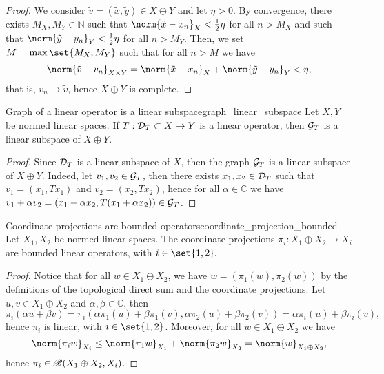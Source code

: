 \begin{proof}
    We consider \(\tilde{v} = (\tilde{x}, \tilde{y}) \in X \oplus Y\) and let \(\eta > 0\). By convergence, there exists \(M_X, M_Y \in \mathbb{N}\) such that \(\norm{\tilde{x} - x_n}_X < \frac12 \eta\) for all \(n > M_X\) and such that \(\norm{\tilde{y} - y_n}_Y < \frac12 \eta\) for all \(n > M_Y\). Then, we set \(M = \max\set{M_X, M_Y}\) such that for all \(n > M\) we have
    \begin{equation*}
        \norm{\tilde{v} - v_n}_{X\times Y} = \norm{\tilde{x} - x_n}_X + \norm{\tilde{y} - y_n}_Y < \eta,
    \end{equation*}
    that is, \(v_n \to \tilde{v}\), hence \(X \oplus Y\) is complete.
\end{proof}

\begin{proposition}{Graph of a linear operator is a linear subspace}{graph_linear_subspace}
    Let \(X, Y\) be normed linear spaces. If \(T : \mathcal{D}_{T} \subset X \to Y\) is a linear operator, then \(\mathcal{G}_{T}\) is a linear subspace of \(X \oplus Y\).
\end{proposition}
\begin{proof}
    Since \(\mathcal{D}_{T}\) is a linear subspace of \(X\), then the graph \(\mathcal{G}_{T}\) is a linear subspace of \(X \oplus Y\). Indeed, let \(v_1, v_2 \in \mathcal{G}_{T}\), then there exists \(x_1, x_2 \in \mathcal{D}_{T}\) such that \(v_1 = (x_1, Tx_1)\) and \(v_2 = (x_2, Tx_2)\), hence for all \(\alpha \in \mathbb{C}\) we have \(v_1 + \alpha v_2 = (x_1 + \alpha x_2, T(x_1 + \alpha x_2)) \in \mathcal{G}_{T}\).
\end{proof}
\begin{proposition}{Coordinate projections are bounded operators}{coordinate_projection_bounded}
    Let \(X_1, X_2\) be normed linear spaces. The coordinate projections \(\pi_i : X_1 \oplus X_2 \to X_i\) are bounded linear operators, with \(i \in \set{1,2}.\)
\end{proposition}
\begin{proof}
    Notice that for all \(w \in X_1 \oplus X_2\), we have \(w = (\pi_1(w), \pi_2(w))\) by the definitions of the topological direct sum and the coordinate projections. Let \(u, v \in X_1 \oplus X_2\) and \(\alpha, \beta \in \mathbb{C}\), then
    \begin{equation*}
        \pi_i(\alpha u + \beta v) = \pi_i\left(\alpha \pi_1(u) + \beta \pi_1(v), \alpha \pi_2(u) + \beta \pi_2(v)\right) = \alpha \pi_i(u) + \beta \pi_i(v),
    \end{equation*}
    hence \(\pi_i\) is linear, with \(i \in \set{1,2}\). Moreover, for all \(w \in X_1 \oplus X_2\) we have
    \begin{equation*}
        \norm{\pi_iw}_{X_i} \leq \norm{\pi_1 w}_{X_1} + \norm{\pi_2 w}_{X_2} = \norm{w}_{X_1\oplus X_2},
    \end{equation*}
    hence \(\pi_i \in \mathscr{B}(X_1 \oplus X_2, X_i)\).
\end{proof}
